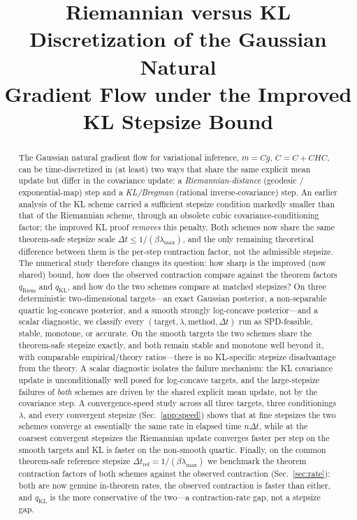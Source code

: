 \documentclass[11pt]{article}
\title{Riemannian versus KL Discretization of the Gaussian Natural\\
Gradient Flow under the Improved KL Stepsize Bound}
\author{}
\date{}
\begin{document}
\maketitle

\begin{abstract}
The Gaussian natural gradient flow for variational inference,
$\dot m=Cg$, $\dot C=C+CHC$, can be time-discretized in (at least) two ways that
share the same explicit mean update but differ in the covariance update: a
\emph{Riemannian-distance} (geodesic / exponential-map) step and a
\emph{KL/Bregman} (rational inverse-covariance) step. An earlier analysis of the
KL scheme carried a sufficient stepsize condition markedly smaller than that of
the Riemannian scheme, through an obsolete cubic covariance-conditioning factor;
the improved KL proof \emph{removes} this penalty. Both schemes now share the same
theorem-safe stepsize scale
$\Delta t\le 1/(\beta\lambda_{\max})$, and the only remaining theoretical
difference between them is the per-step contraction factor, not the admissible
stepsize. The numerical study therefore changes its question: how sharp is the
improved (now shared) bound, how does the observed contraction compare against the
theorem factors $q_{\mathrm{Riem}}$ and $q_{\mathrm{KL}}$, and how do the two
schemes compare at matched stepsizes? On three deterministic two-dimensional
targets---an exact Gaussian posterior, a non-separable quartic log-concave
posterior, and a smooth strongly log-concave posterior---and a scalar diagnostic,
we classify every $(\text{target},\lambda,\text{method},\Delta t)$ run as
SPD-feasible, stable, monotone, or accurate. On the smooth targets the two schemes
share the theorem-safe stepsize exactly, and both remain stable and monotone well
beyond it, with comparable empirical/theory ratios---there is no KL-specific
stepsize disadvantage from the theory. A scalar diagnostic isolates the failure
mechanism: the KL covariance update is unconditionally well posed for log-concave
targets, and the large-stepsize failures of \emph{both} schemes are driven by the
shared explicit mean update, not by the covariance step. A convergence-speed study
across all three targets, three conditionings $\lambda$, and every convergent
stepsize (Sec.~\ref{app:speed}) shows that at fine stepsizes the two schemes
converge at essentially the same rate in elapsed time $n\Delta t$, while at the
coarsest convergent stepsizes the Riemannian update converges faster per step on
the smooth targets and KL is faster on the non-smooth quartic. Finally, on the
common theorem-safe reference stepsize
$\Delta t_{\mathrm{ref}}=1/(\beta\lambda_{\max})$ we benchmark the theorem
contraction factors of both schemes against the observed contraction
(Sec.~\ref{sec:rate}): both are now genuine in-theorem rates, the observed
contraction is faster than either, and $q_{\mathrm{KL}}$ is the more conservative
of the two---a contraction-rate gap, not a stepsize gap.
\end{abstract}
\end{document}

